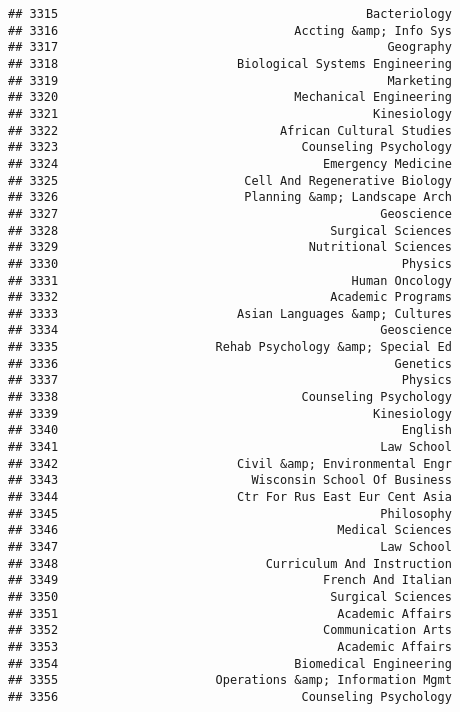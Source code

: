 \documentclass[
]{article}
\begin{document}
\begin{verbatim}
## 3315                                           Bacteriology
## 3316                                 Accting &amp; Info Sys
## 3317                                              Geography
## 3318                         Biological Systems Engineering
## 3319                                              Marketing
## 3320                                 Mechanical Engineering
## 3321                                            Kinesiology
## 3322                               African Cultural Studies
## 3323                                  Counseling Psychology
## 3324                                     Emergency Medicine
## 3325                          Cell And Regenerative Biology
## 3326                          Planning &amp; Landscape Arch
## 3327                                             Geoscience
## 3328                                      Surgical Sciences
## 3329                                   Nutritional Sciences
## 3330                                                Physics
## 3331                                         Human Oncology
## 3332                                      Academic Programs
## 3333                         Asian Languages &amp; Cultures
## 3334                                             Geoscience
## 3335                      Rehab Psychology &amp; Special Ed
## 3336                                               Genetics
## 3337                                                Physics
## 3338                                  Counseling Psychology
## 3339                                            Kinesiology
## 3340                                                English
## 3341                                             Law School
## 3342                         Civil &amp; Environmental Engr
## 3343                           Wisconsin School Of Business
## 3344                         Ctr For Rus East Eur Cent Asia
## 3345                                             Philosophy
## 3346                                       Medical Sciences
## 3347                                             Law School
## 3348                             Curriculum And Instruction
## 3349                                     French And Italian
## 3350                                      Surgical Sciences
## 3351                                       Academic Affairs
## 3352                                     Communication Arts
## 3353                                       Academic Affairs
## 3354                                 Biomedical Engineering
## 3355                      Operations &amp; Information Mgmt
## 3356                                  Counseling Psychology

\end{verbatim}
\end{document}
